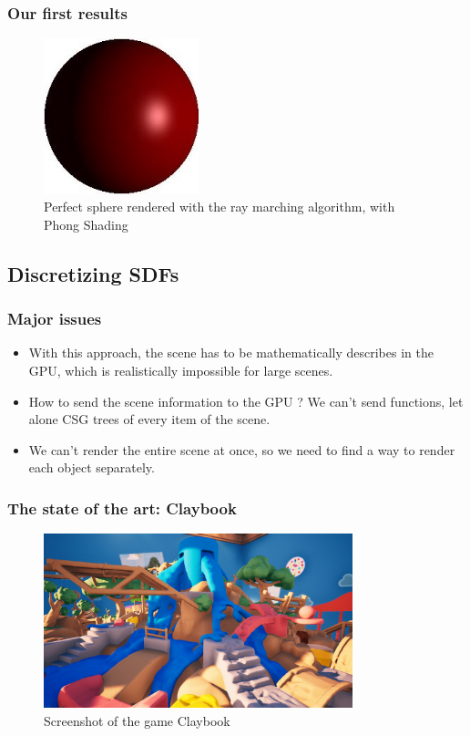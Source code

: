 \documentclass[handout]{beamer}
\begin{document}
\begin{frame}
  \frametitle{Our first results}
  \begin{figure}
    \centering
    \includegraphics[width=0.4\textwidth]{figures/ray_marching_phong.JPG}
    \caption{Perfect sphere rendered with the ray marching algorithm, with Phong Shading}
    \label{fig:sphere-phong}
  \end{figure}
\end{frame}

\subsection{Discretizing SDFs}

\begin{frame}
  \frametitle{Major issues}

  \begin{itemize}
    \item With this approach, the scene has to be mathematically describes in the GPU, which is realistically impossible for large scenes.
    \item How to send the scene information to the GPU ? We can't send functions, let alone CSG trees of every item of the scene.
    \item We can't render the entire scene at once, so we need to find a way to render each object separately.
  \end{itemize} 
  
\end{frame}

\begin{frame}
  \frametitle{The state of the art: Claybook}
  \begin{figure}
    \centering
    \includegraphics[width=0.8\textwidth]{figures/claybook.jpg}
    \caption{Screenshot of the game Claybook}
    \label{fig:claybook}
  \end{figure}
\end{frame}
\end{document}
